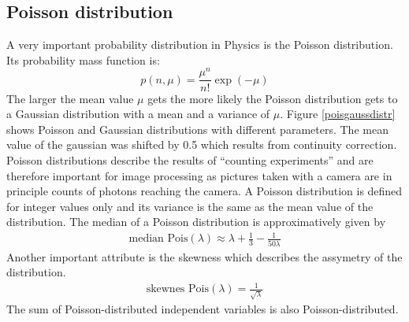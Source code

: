 \subsection{Poisson distribution}
A very important probability distribution in Physics is the Poisson
distribution. Its probability mass function is:
\begin{equation}
	p(n,\mu) = \frac{\mu^n}{n!}\exp(-\mu)
\end{equation}
The larger the mean value $\mu$ gets the more likely the Poisson distribution gets to a Gaussian distribution with a mean and a variance of $\mu$. Figure \ref{poisgaussdistr} shows Poisson and Gaussian distributions with different parameters. The mean value of the gaussian was shifted by 0.5 which results from continuity correction.\newline
Poisson distributions describe the results of ``counting experiments'' and are
therefore important for image processing as pictures taken with a
camera are in principle counts of photons reaching the camera.  \newline
A Poisson distribution is defined for integer values only and its variance is
the same as the mean value of the distribution.\newline
The median of a Poisson distribution is approximatively given by
\begin{align}
	\text{median Pois}(\lambda) \approx \lambda + \frac{1}{3} - \frac{1}{50\lambda} \label{meanMedianPoiss}
\end{align}
Another important attribute is
the skewness which describes the assymetry of the distribution.
\begin{align}
 \text{skewnes Pois}(\lambda) = \frac{1}{\sqrt{\lambda}}
\end{align}
The sum of Poisson-distributed independent variables is also Poisson-distributed.
